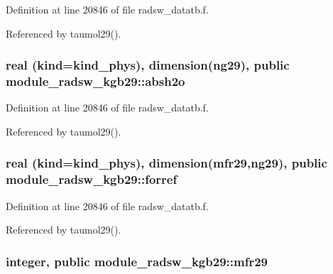 Definition at line 20846 of file radsw\+\_\+datatb.\+f.



Referenced by taumol29().

\subsubsection[{\texorpdfstring{absh2o}{absh2o}}]{\setlength{\rightskip}{0pt plus 5cm}real (kind=kind\+\_\+phys), dimension(ng29), public module\+\_\+radsw\+\_\+kgb29\+::absh2o}\hypertarget{namespacemodule__radsw__kgb29_acab70725ca7faf002f04306fe1798e02}{}\label{namespacemodule__radsw__kgb29_acab70725ca7faf002f04306fe1798e02}


Definition at line 20846 of file radsw\+\_\+datatb.\+f.



Referenced by taumol29().

\subsubsection[{\texorpdfstring{forref}{forref}}]{\setlength{\rightskip}{0pt plus 5cm}real (kind=kind\+\_\+phys), dimension({\bf mfr29},ng29), public module\+\_\+radsw\+\_\+kgb29\+::forref}\hypertarget{namespacemodule__radsw__kgb29_a6e4d495b4588d3c794047e71497661a0}{}\label{namespacemodule__radsw__kgb29_a6e4d495b4588d3c794047e71497661a0}


Definition at line 20846 of file radsw\+\_\+datatb.\+f.



Referenced by taumol29().

\subsubsection[{\texorpdfstring{mfr29}{mfr29}}]{\setlength{\rightskip}{0pt plus 5cm}integer, public module\+\_\+radsw\+\_\+kgb29\+::mfr29}\hypertarget{namespacemodule__radsw__kgb29_a866ce18e53b84d75d51dd8c6a999ee7b}{}\label{namespacemodule__radsw__kgb29_a866ce18e53b84d75d51dd8c6a999ee7b}



